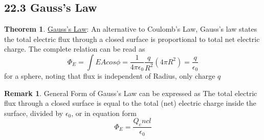 \documentclass[12pt]{amsart}
\theoremstyle{definition}
\newtheorem{theorem}{Theorem}  %
\newtheorem*{remark}{Remark}        %
\numberwithin{equation}{theorem}    %
\begin{document}
\subsection*{22.3 Gauss's Law}

\begin{theorem}
    \underline{Gauss's Law}:
    An alternative to Coulomb's Law, Gauss's law states the total electric flux
    through a closed surface is proportional to total net electric charge. The
    complete relation can be read as 
    $$\Phi_E = \int EA cos\phi = \frac{1}{4\pi \epsilon_0} \frac{q}{R^2}(4\pi R^2) = \frac{q}{\epsilon_0}$$
    for a sphere, noting that flux is independent of Radius, only charge $q$


    \begin{remark}
        General Form of Gauss's Law can be expressed as The total electric 
        flux through a closed surface is equal to the total (net) electric 
        charge inside the surface, divided by $\epsilon_0$, or in equation form 
        $$\Phi_E = \frac{Q_encl}{\epsilon_0}$$
    \end{remark}
\end{theorem}
\end{document}
